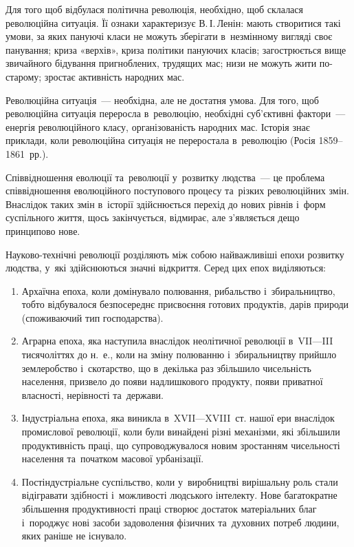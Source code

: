 \documentclass[a5paper,oneside,DIV=12,12pt,headings=small]{scrartcl}
\begin{document}
		Для того щоб відбулася політична революція, необхідно, щоб склалася революційна ситуація. Її ознаки характеризує В.\,І.\,Ленін: мають створитися такі умови, за яких пануючі класи не можуть зберігати в~незмінному вигляді своє панування; криза «верхів», криза політики пануючих класів; загострюється вище звичайного бідування пригноблених, трудящих мас; низи не можуть жити по-старому; зростає активність народних мас.
		
		Революційна ситуація~— необхідна, але не достатня умова. Для того, щоб революційна ситуація переросла в~революцію, необхідні суб'\-єктивні фактори~— енергія революційного класу, організованість народних мас. Історія знає приклади, коли революційна ситуація не переростала в~революцію (Росія 1859–1861~рр.).
		
		Співвідношення еволюції та~революції у~розвитку людства~— це проблема співвідношення еволюційного поступового процесу та~різких революційних змін. Внаслідок таких змін в~історії здійснюється перехід до нових рівнів і~форм суспільного життя, щось закінчується, відмирає, але з'являється дещо принципово нове. 
		
		Науково-технічні революції розділяють між собою найважливіші епохи розвитку людства, у~які здійснюються значні відкриття. Серед цих епох виділяються:
		\begin{enumerate}
			\item Архаїчна епоха, коли домінувало полювання, рибальство і~збиральництво, тобто відбувалося безпосереднє присвоєння готових продуктів, дарів природи (споживаючий тип господарства).
			\item Аграрна епоха, яка наступила внаслідок неолітичної революції в~VII—III тисячоліттях до н.~е., коли на зміну полюванню і~збиральництву прийшло землеробство і~скотарство, що в~декілька раз збільшило чисельність населення, призвело до появи надлишкового продукту, появи приватної власності, нерівності та~держави.
			\item Індустріальна епоха, яка виникла в~XVII—XVIII~ст. нашої ери внаслідок промислової революції, коли були винайдені різні механізми, які збільшили продуктивність праці, що супроводжувалося новим зростанням чисельності населення та~початком масової урбанізації. 
			\item Постіндустріальне суспільство, коли у~виробництві вирішальну роль стали відігравати здібності і~можливості людського інтелекту. Нове багатократне збільшення продуктивності праці створює достаток матеріальних благ і~породжує нові засоби задоволення фізичних та~духовних потреб людини, яких раніше не існувало.
		\end{enumerate}
\end{document}
